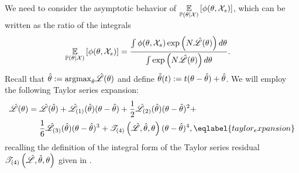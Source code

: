We need to consider the asymptotic behavior of $\underset{\mathbb{P}(\theta | {\mathcal{X}})}{\mathbb{E}}\left[\phi(\theta, {\mathcal{X}}_s)\right]$,
which can be written as the ratio of the integrals
%
\begin{align*}
\underset{\mathbb{P}(\theta | {\mathcal{X}})}{\mathbb{E}}\left[\phi(\theta, {\mathcal{X}}_s)\right] ={}&
\frac{\int \phi(\theta, {\mathcal{X}}_s)
        \exp\left(N \hat{\mathscr{L}}(\theta)\right)
        d \theta}
  {\int \exp\left(N\hat{\mathscr{L}}(\theta)\right) d \theta}.
\end{align*}
%
Recall that $\hat\theta := \mathrm{argmax}_\theta \hat{\mathscr{L}}(\theta)$ and
define $\tilde{\theta}(t) := t (\theta - \hat\theta) + \hat\theta$.  We will
employ the following Taylor series expansion:
\begin{align}
\likhat(\theta) ={}&
    \likhat(\thetahat) +
    \likhatk{1}(\thetahat)(\theta - \thetahat) +
    \frac{1}{2}\likhatk{2}(\thetahat)(\theta - \thetahat)^2 +
\nonumber
\\&
    \frac{1}{6}\likhatk{3}(\thetahat)(\theta - \thetahat)^3 +
    \tresid{4}{\likhat, \thetahat, \theta} (\theta - \thetahat)^4,
    \eqlabel{taylor_expansion}
\end{align}
%
recalling the definition of the integral form of the Taylor series residual
$\mathscr{T}_{(4)}\left(\hat{\mathscr{L}}, \hat\theta, \theta\right)$ given in .

